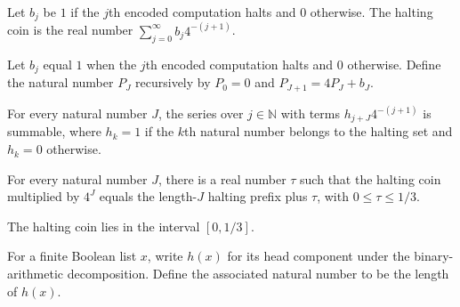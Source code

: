 \begin{definition}
\label{Randomized.haltCoin}
\leanok
{}
Let $b_j$ be $1$ if the $j$th encoded computation halts and $0$ otherwise. The halting
coin is the real number $\sum_{j=0}^{\infty} b_j4^{-(j+1)}$.
\end{definition}

\begin{definition}
\label{Randomized.haltPrefix}
\leanok
{}
Let $b_j$ equal $1$ when the $j$th encoded computation halts and $0$ otherwise. Define
the natural number $P_J$ recursively by $P_0=0$ and $P_{J+1}=4P_J+b_J$.
\end{definition}

\begin{theorem}
\label{Randomized.summable_haltCoin}
\leanok
{}
For every natural number $J$, the series over $j \in \mathbb{N}$ with terms
$h_{j+J}4^{-(j+1)}$ is summable, where $h_k=1$ if the $k$th natural number belongs to
the halting set and $h_k=0$ otherwise.
\end{theorem}

\begin{theorem}
\label{Randomized.haltCoin_mul_pow}
\leanok
{}
For every natural number $J$, there is a real number $\tau$ such that the halting coin
multiplied by $4^J$ equals the length-$J$ halting prefix plus $\tau$, with $0\le\tau\le
1/3$.
\end{theorem}

\begin{theorem}
\label{Randomized.haltCoin_mem}
\leanok
{}
The halting coin lies in the interval $[0,1/3]$.
\end{theorem}

\begin{definition}
\label{Randomized.hlN}
\leanok
{}
For a finite Boolean list $x$, write $h(x)$ for its head component under the
binary-arithmetic decomposition. Define the associated natural number to be the length
of $h(x)$.
\end{definition}

